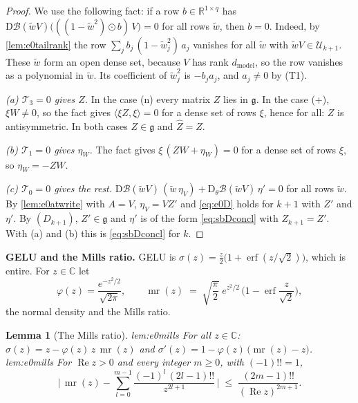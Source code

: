 \documentclass[10pt]{article}
\newtheorem{lemma}[theorem]{Lemma}
\theoremstyle{definition}
\theoremstyle{remark}
\newcommand{\R}{\mathbb{R}}
\newcommand{\dm}{d_{\mathrm{model}}}
\newcommand{\Der}{\mathrm{D}}
\newcommand{\para}[1]{\smallskip\noindent\textbf{#1}\hspace{0.5em}}
\newcommand{\ptlabel}[1]{\phantomsection\label{#1}}
\newcommand{\stpart}[3]{\ifx\relax#1\relax\else\ptlabel{#1:#2}\fi{\upshape\bfseries\boldmath(#2)\ifx\relax#3\relax\else\ #3.\fi}}
\begin{document}
\begin{proof}
We use the following fact: if a row $b \in \R^{1\times q}$ has $\Der\mathcal B(\tilde wV)\big(((1 - \tilde w^2)\odot b)\,V\big) = 0$ for all rows $\tilde w$, then $b = 0$. Indeed, by \cref{lem:e0tailrank} the row $\sum_j b_j\,(1 - \tilde w_j^2)\,a_j$ vanishes for all $\tilde w$ with $\tilde wV \in \mathcal U_{k+1}$. These $\tilde w$ form an open dense set, because $V$ has rank $\dm$, so the row vanishes as a polynomial in $\tilde w$. Its coefficient of $\tilde w_j^2$ is $-b_ja_j$, and $a_j \neq 0$ by (T1).

\emph{(a) $\mathcal T_3 = 0$ gives $Z$.} In the case (n) every matrix $Z$ lies in $\mathfrak g$. In the case (+), $\xi W \neq 0$, so the fact gives $\langle\xi Z, \xi\rangle = 0$ for a dense set of rows $\xi$, hence for all: $Z$ is antisymmetric. In both cases $Z \in \mathfrak g$ and $\widehat Z = Z$.

\emph{(b) $\mathcal T_1 = 0$ gives $\eta_W$.} The fact gives $\xi\,(ZW + \eta_W) = 0$ for a dense set of rows $\xi$, so $\eta_W = -ZW$.

\emph{(c) $\mathcal T_0 = 0$ gives the rest.} $\Der\mathcal B(\tilde wV)\,(\tilde w\,\eta_V) + \Der_\theta\mathcal B(\tilde wV)\,\eta' = 0$ for all rows $\tilde w$. By \cref{lem:e0atwrite} with $A = V$, $\eta_V = VZ'$ and \eqref{eq:e0D} holds for $k+1$ with $Z'$ and $\eta'$. By $(D_{k+1})$, $Z' \in \mathfrak g$ and $\eta'$ is of the form \eqref{eq:sbDconcl} with $Z_{k+1} = Z'$. With (a) and (b) this is \eqref{eq:sbDconcl} for $k$.
\end{proof}

\para{GELU and the Mills ratio.} GELU is $\sigma(z) = \frac z2\big(1 + \operatorname{erf}(z/\sqrt2)\big)$, which is entire. For $z \in \mathbb C$ let
\[
\varphi(z) = \frac{e^{-z^2/2}}{\sqrt{2\pi}}, \qquad \operatorname{mr}(z) \;=\; \sqrt{\frac{\pi}{2}}\;e^{z^2/2}\,\Big(1 - \operatorname{erf}\frac{z}{\sqrt2}\Big),
\]
the normal density and the Mills ratio.

\begin{lemma}[The Mills ratio]\label{lem:e0mills}
\stpart{lem:e0mills}{i}{} For all $z \in \mathbb C$: $\sigma(z) = z - \varphi(z)\,z\,\operatorname{mr}(z)$ and $\sigma'(z) = 1 - \varphi(z)\,\big(\operatorname{mr}(z) - z\big)$.\\
\stpart{lem:e0mills}{ii}{} For $\operatorname{Re}z > 0$ and every integer $m \ge 0$, with $(-1)!! = 1$,
\[
\Big\lvert\,\operatorname{mr}(z) - \sum_{l=0}^{m-1}\frac{(-1)^l\,(2l-1)!!}{z^{2l+1}}\,\Big\rvert \;\le\; \frac{(2m-1)!!}{(\operatorname{Re}z)^{2m+1}} .
\]
\end{lemma}
\end{document}
